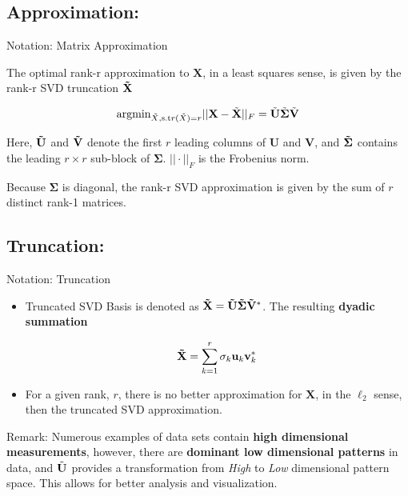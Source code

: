 \documentclass[9pt]{beamer}
\begin{document}
\subsection{Approximation:}
\begin{frame}{Notation: Matrix Approximation}
    \begin{theorem}
        The optimal rank-r approximation to $\mathbf{X}$, in a least squares sense, is given by the rank-r SVD truncation $\mathbf{\Tilde{X}}$
        
        \begin{equation}
            \text{argmin}_{\Tilde{X}, \text{s.t} r(\Tilde{X}) = r} ||\mathbf{X} - \Tilde{\mathbf{X}}||_{F} = \Tilde{\mathbf{U}}\Tilde{\mathbf{\Sigma}}\Tilde{\mathbf{V}}
        \end{equation}
        
        Here, $\mathbf{\Tilde{U}}$ and $\mathbf{\Tilde{V}}$ denote the first $r$ leading columns of $\mathbf{U}$ and $\mathbf{V}$, and $\mathbf{\Tilde{\Sigma}}$ contains the leading $r \times r$ sub-block of $\mathbf{\Sigma}$. $||\cdot||_{F}$ is the Frobenius norm\footnotemark. 
        
        Because $\mathbf{\Sigma}$ is diagonal, the rank-r SVD approximation is given by the sum of $r$ distinct rank-1 matrices.
    \end{theorem}
\end{frame}

\subsection{Truncation:}
\begin{frame}{Notation: Truncation}

\begin{itemize}
    \item Truncated SVD Basis is denoted as $\mathbf{\Tilde{X}} = \mathbf{\Tilde{U}}\mathbf{\Tilde{\Sigma}}\mathbf{\Tilde{V}}^{*}$. The resulting \textbf{dyadic summation}
    
    \begin{equation}
        \mathbf{\Tilde{X}} = \sum_{k=1}^{r}\sigma_{k}\mathbf{u}_{k}\mathbf{v}_{k}^{*}
    \end{equation}
    
    \item For a given rank, $r$, there is no better approximation for $\mathbf{X}$, in the $\ell_{2}$ sense, then the truncated SVD approximation. 
\end{itemize}

\begin{alertblock}{Remark:}
    Numerous examples of data sets contain \textbf{high dimensional measurements}, however, there are \textbf{dominant low dimensional patterns} in data, and $\Tilde{\mathbf{U}}$ provides a transformation from \textit{High} to \textit{Low} dimensional pattern space. This allows for better analysis and visualization.
\end{alertblock}
\end{frame}
\end{document}
